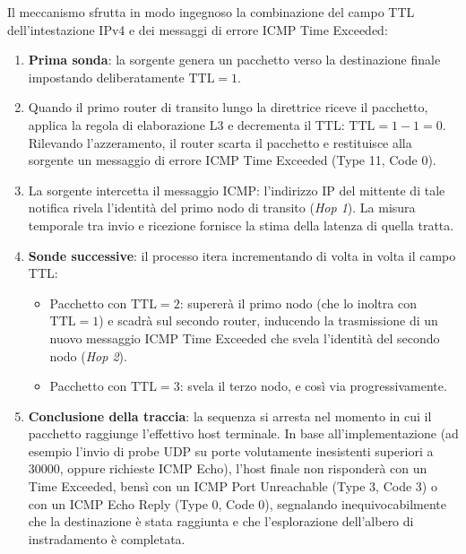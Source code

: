 \documentclass[11pt, a4paper]{article}
\begin{document}

Il meccanismo sfrutta in modo ingegnoso la combinazione del campo TTL dell'intestazione IPv4 e dei messaggi di errore ICMP Time Exceeded:
\begin{enumerate}
    \item \textbf{Prima sonda}: la sorgente genera un pacchetto verso la destinazione finale impostando deliberatamente $\text{TTL} = 1$.
    \item Quando il primo router di transito lungo la direttrice riceve il pacchetto, applica la regola di elaborazione L3 e decrementa il TTL: $\text{TTL} = 1 - 1 = 0$. Rilevando l'azzeramento, il router scarta il pacchetto e restituisce alla sorgente un messaggio di errore ICMP Time Exceeded (Type 11, Code 0).
    \item La sorgente intercetta il messaggio ICMP: l'indirizzo IP del mittente di tale notifica rivela l'identità del primo nodo di transito (\emph{Hop 1}). La misura temporale tra invio e ricezione fornisce la stima della latenza di quella tratta.
    \item \textbf{Sonde successive}: il processo itera incrementando di volta in volta il campo TTL:
    \begin{itemize}
        \item Pacchetto con $\text{TTL} = 2$: supererà il primo nodo (che lo inoltra con $\text{TTL} = 1$) e scadrà sul secondo router, inducendo la trasmissione di un nuovo messaggio ICMP Time Exceeded che svela l'identità del secondo nodo (\emph{Hop 2}).
        \item Pacchetto con $\text{TTL} = 3$: svela il terzo nodo, e così via progressivamente.
    \end{itemize}
    \item \textbf{Conclusione della traccia}: la sequenza si arresta nel momento in cui il pacchetto raggiunge l'effettivo host terminale. In base all'implementazione (ad esempio l'invio di probe UDP su porte volutamente inesistenti superiori a 30000, oppure richieste ICMP Echo), l'host finale non risponderà con un Time Exceeded, bensì con un ICMP Port Unreachable (Type 3, Code 3) o con un ICMP Echo Reply (Type 0, Code 0), segnalando inequivocabilmente che la destinazione è stata raggiunta e che l'esplorazione dell'albero di instradamento è completata.
\end{enumerate}
\end{document}

